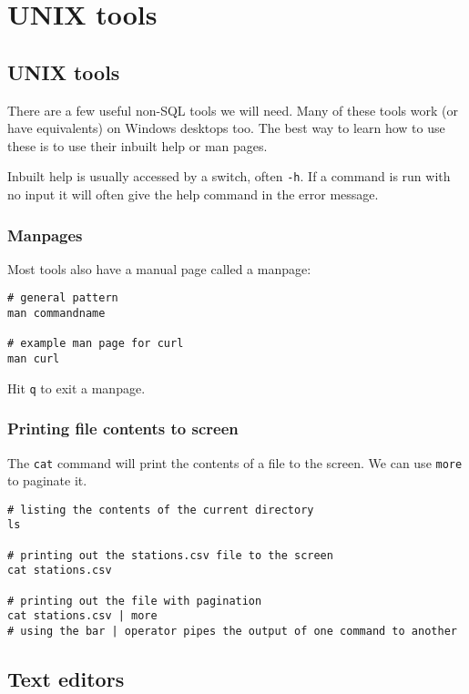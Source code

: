 \chapter{UNIX tools}

\section{UNIX tools}\label{unix-tools}

There are a few useful non-SQL tools we will need. Many of these tools work (or have equivalents) on Windows desktops too.
The best way to learn how to use these is to use their inbuilt help or man pages.

Inbuilt help is usually accessed by a switch, often \texttt{-h}.
If a command is run with no input it will often give the help command in the error message.

\subsection{Manpages}

Most tools also have a manual page called a manpage:

\begin{verbatim}
# general pattern
man commandname

# example man page for curl 
man curl
\end{verbatim}

Hit \texttt{q} to exit a manpage.

\subsection{Printing file contents to screen}
\label{printing-file-contents-to-screen}

The \texttt{cat} command will print the contents of a file to the screen.
We can use \texttt{more} to paginate it.

\begin{verbatim}
# listing the contents of the current directory
ls

# printing out the stations.csv file to the screen
cat stations.csv

# printing out the file with pagination
cat stations.csv | more
# using the bar | operator pipes the output of one command to another
\end{verbatim}

\section{Text editors}


